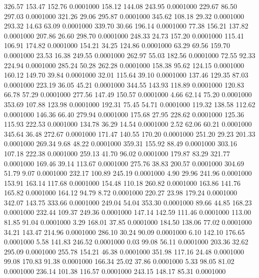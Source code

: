  326.57  153.47  152.76   0.0001000
 158.12  144.08  243.95   0.0001000
 229.67   86.50  297.03   0.0001000
 321.26   29.06  295.87   0.0001000
 345.62  108.18   29.32   0.0001000
 293.32   14.63   63.09   0.0001000
 339.70   30.66  196.14   0.0001000
  77.38  156.21  137.82   0.0001000
 207.86   26.60  298.70   0.0001000
 248.33   24.73  157.20   0.0001000
 115.41  106.91  174.82   0.0001000
 154.21   34.25  124.86   0.0001000
  63.29   69.56  159.70   0.0001000
  23.53   16.38  249.55   0.0001000
 262.97   55.03  182.56   0.0001000
  72.55   92.33  224.94   0.0001000
 285.24   50.28  262.28   0.0001000
 158.38   95.62  124.15   0.0001000
 160.12  149.70   39.84   0.0001000
  32.01  115.64   39.10   0.0001000
 137.46  129.35   87.03   0.0001000
 223.19   36.05   45.21   0.0001000
 344.55  143.93  118.89   0.0001000
 120.83   66.78   57.29   0.0001000
 277.56  147.49  150.57   0.0001000
   4.66   62.14   75.20   0.0001000
 353.69  107.88  123.98   0.0001000
 192.31   75.45   54.71   0.0001000
 119.32  138.58  112.62   0.0001000
 146.36   66.40  279.94   0.0001000
 175.68   27.95  228.62   0.0001000
 125.36  115.93  222.53   0.0001000
 134.78   36.29   14.54   0.0001000
   2.52   62.06   60.21   0.0001000
 345.64   36.48  272.67   0.0001000
 171.47  140.55  170.20   0.0001000
 251.20   29.23  201.33   0.0001000
 269.34    9.68   48.22   0.0001000
 359.31  155.92   88.49   0.0001000
 303.16  107.18  222.38   0.0001000
 259.13   41.70   96.02   0.0001000
 179.87   83.29  321.77   0.0001000
 169.46   39.14  113.67   0.0001000
 275.76   38.83  200.57   0.0001000
 304.69   51.79    9.07   0.0001000
 232.17  100.89  245.19   0.0001000
   4.90   29.96  241.96   0.0001000
 153.91  163.14  117.68   0.0001000
 154.48  110.18  260.82   0.0001000
 163.86  141.76  165.82   0.0001000
 164.12   94.79    8.72   0.0001000
 220.27   23.98  179.24   0.0001000
 342.07  143.75  333.66   0.0001000
 249.04   54.04  353.30   0.0001000
  89.66   44.85  168.23   0.0001000
 232.44  109.37  249.36   0.0001000
 147.14  142.59  111.46   0.0001000
 113.00   81.85   91.04   0.0001000
   3.29  168.01   37.85   0.0001000
 184.50  138.06   77.02   0.0001000
  34.21  143.47  214.96   0.0001000
 286.10   30.24   90.09   0.0001000
   6.10  142.10  176.65   0.0001000
   5.58  141.83  246.52   0.0001000
   0.03   99.08   56.11   0.0001000
 203.36   32.62  295.09   0.0001000
 255.78  154.21   46.38   0.0001000
 351.98  117.16   24.48   0.0001000
  99.08  170.83   91.38   0.0001000
 166.34   25.02   37.86   0.0001000
   5.33   98.05   81.02   0.0001000
 236.14  101.38  116.57   0.0001000
 243.15  148.17   85.31   0.0001000
